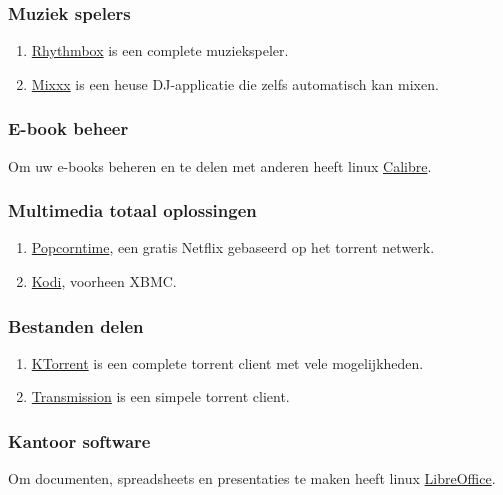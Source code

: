 \subsubsection{Muziek spelers}
\begin{enumerate}
	\item \href{https://wiki.gnome.org/Apps/Rhythmbox}{Rhythmbox} is een complete muziekspeler.
	\item \href{http://mixxx.org/}{Mixxx} is een heuse DJ-applicatie die zelfs automatisch kan mixen.
\end{enumerate}

\subsubsection{E-book beheer}
Om uw e-books beheren en te delen met anderen heeft linux \href{http://calibre-ebook.com/}{Calibre}.

\subsubsection{Multimedia totaal oplossingen}
\begin{enumerate}
	\item \href{http://popcorntime.io/}{Popcorntime}, een gratis Netflix gebaseerd op het torrent netwerk.
		\item \href{http://kodi.tv/}{Kodi}, voorheen XBMC.
\end{enumerate}

\subsubsection{Bestanden delen}
\begin{enumerate}
	\item \href{http://www.ktorrent.org/}{KTorrent} is een complete torrent client met vele mogelijkheden.
	\item \href{https://www.transmissionbt.com/}{Transmission} is een simpele torrent client.
\end{enumerate}

\subsubsection{Kantoor software}
Om documenten, spreadsheets en presentaties te maken heeft linux \href{https://www.libreoffice.org/}{LibreOffice}.

